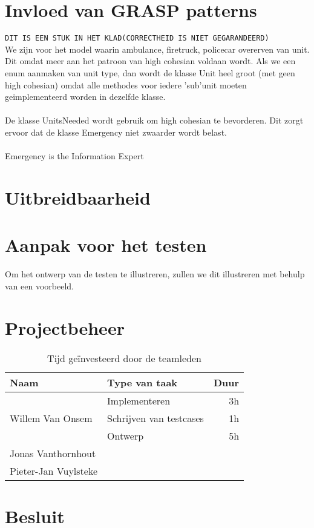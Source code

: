 \documentclass[a4paper, titlepage,12pt]{article}
\begin{document}
\section{Invloed van GRASP patterns}
\verb+DIT IS EEN STUK IN HET KLAD(CORRECTHEID IS NIET GEGARANDEERD)+\\
We zijn voor het model waarin ambulance, firetruck, policecar overerven van unit. Dit omdat meer aan het patroon van high cohesian voldaan wordt. Als we een enum aanmaken van unit type, dan wordt de klasse Unit heel groot (met geen high cohesian) omdat alle methodes voor iedere 'sub'unit moeten geimplementeerd worden in dezelfde klasse.\\\\
De klasse UnitsNeeded wordt gebruik om high cohesian te bevorderen. Dit zorgt ervoor dat de klasse Emergency niet zwaarder wordt belast.\\\\
Emergency is the Information Expert
\label{grasp}
\newpage
\section{Uitbreidbaarheid}
\label{uitbreidbaarheid}
\newpage
\section{Aanpak voor het testen}
\label{testen}
Om het ontwerp van de testen te illustreren, zullen we dit illustreren met behulp van een voorbeeld.

\newpage
\section{Projectbeheer}
\label{projectbeheer}
\begin{table}[H]
\centering
\begin{tabular}{|llr|}
\hline
Naam&Type van taak&Duur\\
\hline
\hline
\multirow{3}{*}{Willem Van Onsem}&Implementeren&3h\\
&Schrijven van testcases&1h\\
&Ontwerp&5h\\
\hline
Jonas Vanthornhout&&\\
\hline
Pieter-Jan Vuylsteke&&\\
\hline
\end{tabular}
\caption{Tijd ge\"investeerd door de teamleden}
\label{tbl:timeUsage}
\end{table}
\newpage
\section{Besluit}
\label{besluit}
\newpage
\nocite{*}


\end{document}
